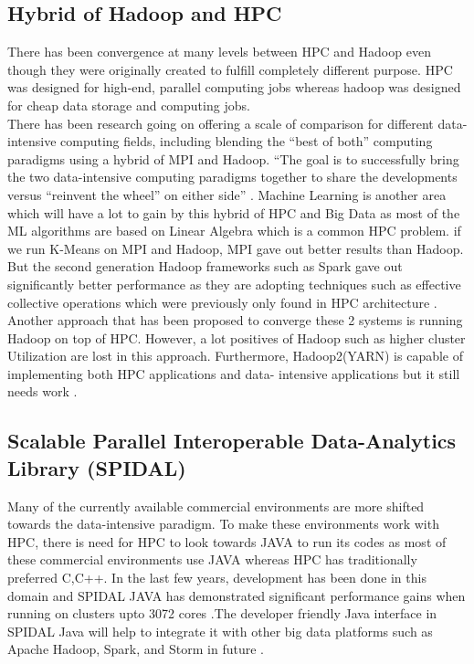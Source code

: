 \documentclass[sigconf]{acmart}
\begin{document}
\subsection{Hybrid of Hadoop and HPC}
There has been convergence at many levels between HPC and Hadoop even though they were originally created to fulfill completely different purpose. HPC was designed for high-end, parallel computing jobs whereas hadoop was designed for cheap data storage and computing jobs. 
\\
There has been research going on offering a scale of comparison for different data-intensive computing fields, including blending the ``best of both'' computing paradigms using a hybrid of MPI and Hadoop. ``The goal is to successfully bring the two data-intensive computing paradigms together to share the developments versus ``reinvent the wheel'' on either side'' \cite{Luckow2013}. Machine Learning is another area which will have a lot to gain by this hybrid of HPC and Big Data as most of the ML algorithms are based on Linear Algebra which is a common HPC problem. if we run K-Means on MPI and Hadoop, MPI gave out better results than Hadoop. But the second generation Hadoop frameworks such as Spark gave out significantly better performance as they are adopting techniques such as effective collective operations which were previously only found in HPC architecture \cite{Luckow2013}. \\
Another approach that has been proposed to converge these 2 systems is running Hadoop on top of HPC. However, a lot positives of Hadoop such as higher cluster Utilization are lost in this approach. Furthermore, Hadoop2(YARN) is capable of implementing both HPC applications and data- intensive applications but it still needs work \cite{JhaQLMF14}.

\subsection{Scalable Parallel Interoperable Data-Analytics Library (SPIDAL)}
Many of the currently available commercial environments are more shifted towards the data-intensive paradigm. To make these environments work with HPC, there is need for HPC to look towards JAVA to run its codes as most of these commercial environments use JAVA whereas HPC has traditionally preferred C,C++. In the last few years, development has been done in this domain and SPIDAL JAVA has demonstrated significant performance gains when running on clusters upto 3072 cores \cite{Spidal}.The developer friendly Java interface in SPIDAL Java will help to integrate it with other big data platforms such as Apache Hadoop, Spark, and Storm in future \cite{Spidal}.
\end{document}
